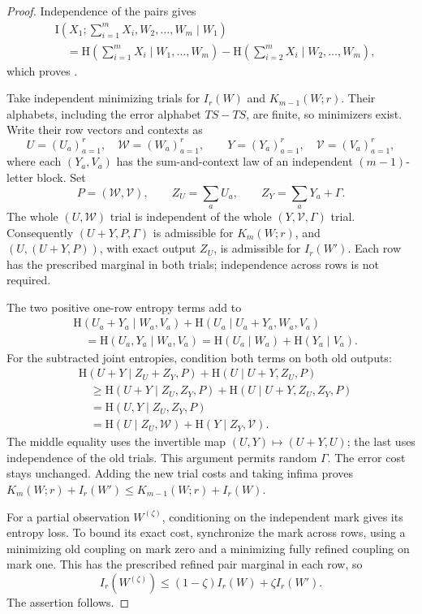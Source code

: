 \begin{proof}
Independence of the pairs gives
\[
 \begin{split}
 &\mathrm I\left(X_1;\sum_{i=1}^mX_i,W_2,\ldots,W_m\mid W_1\right)\\
 &\quad=\mathrm H\left(\sum_{i=1}^mX_i\mid W_1,\ldots,W_m\right)
       -\mathrm H\left(\sum_{i=2}^mX_i\mid W_2,\ldots,W_m\right),
 \end{split}
\]
which proves .

Take independent minimizing trials for $I_r(W)$ and $K_{m-1}(W;r)$.
Their alphabets, including the error alphabet $TS-TS$, are finite, so
minimizers exist. Write their row vectors and contexts as
\[
 U=(U_a)_{a=1}^r,\quad\mathcal W=(W_a)_{a=1}^r,
 \qquad Y=(Y_a)_{a=1}^r,\quad\mathcal V=(V_a)_{a=1}^r,
\]
where each $(Y_a,V_a)$ has the sum-and-context law of an independent
$(m-1)$-letter block. Set
\[
 P=(\mathcal W,\mathcal V),\qquad Z_U=\sum_aU_a,\qquad
 Z_Y=\sum_aY_a+\Gamma.
\]
The whole $(U,\mathcal W)$ trial is independent of the whole
$(Y,\mathcal V,\Gamma)$ trial. Consequently $(U+Y,P,\Gamma)$ is admissible
for $K_m(W;r)$, and $(U,(U+Y,P))$, with exact output $Z_U$, is admissible
for $I_r(W')$. Each row has the prescribed marginal in both trials;
independence across rows is not required.

The two positive one-row entropy terms add to
\[
 \begin{split}
 &\mathrm H(U_a+Y_a\mid W_a,V_a)
       +\mathrm H(U_a\mid U_a+Y_a,W_a,V_a)\\
 &\quad=\mathrm H(U_a,Y_a\mid W_a,V_a)
       =\mathrm H(U_a\mid W_a)+\mathrm H(Y_a\mid V_a).
 \end{split}
\]
For the subtracted joint entropies, condition both terms on both old outputs:
\begin{equation}
 \begin{split}
 &\mathrm H(U+Y\mid Z_U+Z_Y,P)+\mathrm H(U\mid U+Y,Z_U,P)\\
 &\quad\ge\mathrm H(U+Y\mid Z_U,Z_Y,P)
                +\mathrm H(U\mid U+Y,Z_U,Z_Y,P)\\
 &\quad=\mathrm H(U,Y\mid Z_U,Z_Y,P)\\
 &\quad=\mathrm H(U\mid Z_U,\mathcal W)
                +\mathrm H(Y\mid Z_Y,\mathcal V).
 \end{split}
 \label{entropy-refinement:gluing-entropy}
\end{equation}
The middle equality uses the invertible map $(U,Y)\mapsto(U+Y,U)$;
the last uses independence of the old trials. This argument permits random
$\Gamma$. The error cost stays unchanged. Adding the new trial costs and
taking infima proves
$K_m(W;r)+I_r(W')\le K_{m-1}(W;r)+I_r(W)$.

For a partial observation $W^{(\zeta)}$, conditioning on the independent
mark gives its entropy loss. To bound its exact cost, synchronize the mark
across rows, using a minimizing old coupling on mark zero and a minimizing
fully refined coupling on mark one. This has the prescribed refined pair
marginal in each row, so
\[
 I_r(W^{(\zeta)})\le(1-\zeta)I_r(W)+\zeta I_r(W').
\]
The assertion follows.
\end{proof}

